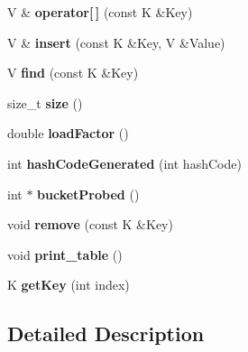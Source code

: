 \begin{DoxyCompactItemize}
\item 
\hypertarget{classHash_a560a4d16dc1a6b68f429c588b2c11545}{}V \& {\bfseries operator\mbox{[}$\,$\mbox{]}} (const K \&Key)\label{classHash_a560a4d16dc1a6b68f429c588b2c11545}

\item 
\hypertarget{classHash_a755799ff6fd76a4a0feec145700a878f}{}V \& {\bfseries insert} (const K \&Key, V \&Value)\label{classHash_a755799ff6fd76a4a0feec145700a878f}

\item 
\hypertarget{classHash_a5785086ca51aa08e7175e97e4a853334}{}V {\bfseries find} (const K \&Key)\label{classHash_a5785086ca51aa08e7175e97e4a853334}

\item 
\hypertarget{classHash_abd05714536838b5bd2a393036c7437db}{}size\+\_\+t {\bfseries size} ()\label{classHash_abd05714536838b5bd2a393036c7437db}

\item 
\hypertarget{classHash_a6b0680a8de89ffa05aefbe05d0e6d738}{}double {\bfseries load\+Factor} ()\label{classHash_a6b0680a8de89ffa05aefbe05d0e6d738}

\item 
\hypertarget{classHash_addea524e1e28ddc1731287f5cbc11c71}{}int {\bfseries hash\+Code\+Generated} (int hash\+Code)\label{classHash_addea524e1e28ddc1731287f5cbc11c71}

\item 
\hypertarget{classHash_a657948b69c87858fb8f197ddb4c9da0b}{}int $\ast$ {\bfseries bucket\+Probed} ()\label{classHash_a657948b69c87858fb8f197ddb4c9da0b}

\item 
\hypertarget{classHash_a453733aa477944c75e30f629f12e7dd7}{}void {\bfseries remove} (const K \&Key)\label{classHash_a453733aa477944c75e30f629f12e7dd7}

\item 
\hypertarget{classHash_a00bb410aea1cce94e1766d70e93534b4}{}void {\bfseries print\+\_\+table} ()\label{classHash_a00bb410aea1cce94e1766d70e93534b4}

\item 
\hypertarget{classHash_a3e5bfab4dde4f0157d7b689d599ab294}{}K {\bfseries get\+Key} (int index)\label{classHash_a3e5bfab4dde4f0157d7b689d599ab294}

\end{DoxyCompactItemize}


\subsection{Detailed Description}
